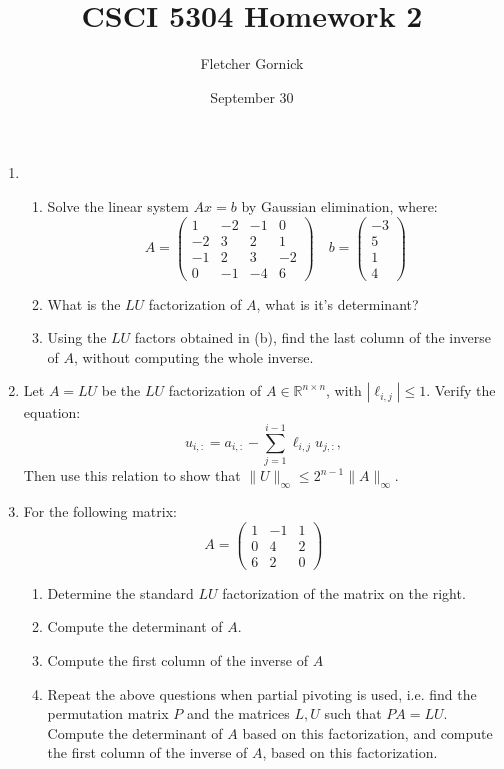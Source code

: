 \documentclass[11pt]{article}
\title{\vspace{-1.0cm}CSCI 5304 Homework 2 }
\author{Fletcher Gornick}
\date{September 30}
\newcommand{\R}{\mathbb{R}}
\begin{document}
\maketitle
\begin{enumerate}
	\item \begin{enumerate}
		      \item Solve the linear system \(Ax = b\) by Gaussian elimination, where:
		            \[A =
			            \begin{pmatrix}
				            1  & -2 & -1 & 0  \\
				            -2 & 3  & 2  & 1  \\
				            -1 & 2  & 3  & -2 \\
				            0  & -1 & -4 & 6
			            \end{pmatrix}
			            \quad b = \begin{pmatrix} -3 \\ 5 \\ 1 \\ 4 \end{pmatrix}
		            \]

		      \item What is the \(LU\) factorization of \(A\), what is it's determinant?

		      \item Using the \(LU\) factors obtained in (b), find the last column of the inverse of \(A\), without computing the whole inverse.
	      \end{enumerate}

	\item Let \(A = LU\) be the \(LU\) factorization of \(A \in \R^{n \times n}\), with \(|\ell_{i,j}| \leq 1\).  Verify the equation:
	      \[u_{i,:} = a_{i,:} - \sum_{j=1}^{i-1} \ell_{i,j}u_{j,:},\]
	      Then use this relation to show that \(\lVert U \rVert_\infty \leq 2^{n-1} \lVert A \rVert_\infty\).

	\item For the following matrix:
	      \[A =
		      \begin{pmatrix}
			      1 & -1 & 1 \\
			      0 & 4  & 2 \\
			      6 & 2  & 0
		      \end{pmatrix}
	      \]
	      \begin{enumerate}
		      \item Determine the standard \(LU\) factorization of the matrix on the right.
		      \item Compute the determinant of \(A\).
		      \item Compute the first column of the inverse of \(A\)
		      \item Repeat the above questions when partial pivoting is used, i.e. find the permutation matrix \(P\) and the matrices \(L,U\) such that \(PA = LU\).  Compute the determinant of \(A\) based on this factorization, and compute the first column of the inverse of \(A\), based on this factorization.
	      \end{enumerate}


\end{enumerate}
\end{document}

